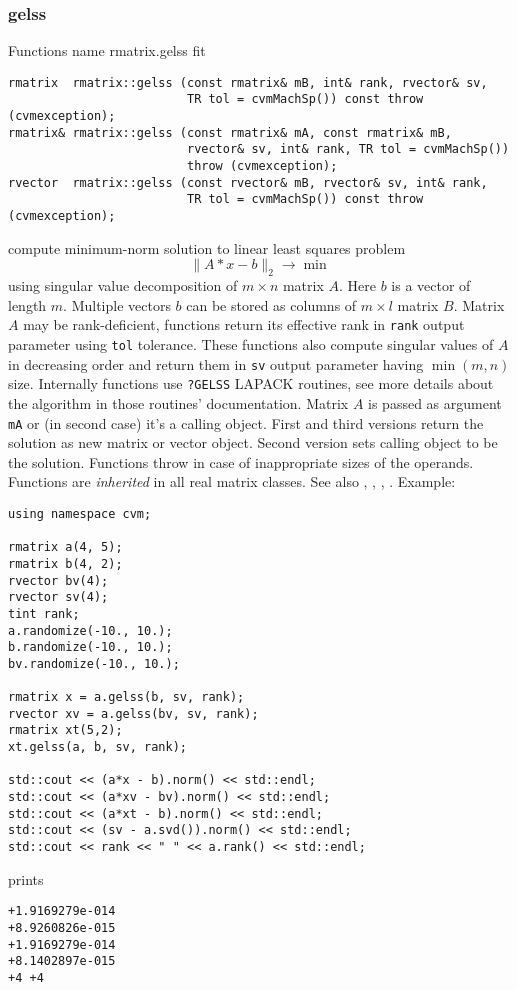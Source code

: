 \subsubsection{gelss}
Functions%
\pdfdest name {rmatrix.gelss} fit
\begin{verbatim}
rmatrix  rmatrix::gelss (const rmatrix& mB, int& rank, rvector& sv,
                         TR tol = cvmMachSp()) const throw (cvmexception);
rmatrix& rmatrix::gelss (const rmatrix& mA, const rmatrix& mB, 
                         rvector& sv, int& rank, TR tol = cvmMachSp()) 
                         throw (cvmexception);
rvector  rmatrix::gelss (const rvector& mB, rvector& sv, int& rank,
                         TR tol = cvmMachSp()) const throw (cvmexception);
\end{verbatim}
compute  minimum-norm solution to  linear
least squares problem 
\begin{equation*}
\|A*x-b\|_2\to\min
\end{equation*}
using  singular value decomposition of $m\times n$ matrix $A$.
Here $b$ is a vector of length $m$.
Multiple vectors $b$ can be stored as columns of $m\times l$ matrix $B$.
Matrix $A$ may be rank-deficient,  functions return its effective rank in \verb"rank"
output parameter using \verb"tol" tolerance. These functions also compute 
singular values of $A$ in decreasing order and return them in \verb"sv" output parameter
having $\min(m,n)$ size.
Internally  functions use \verb"?GELSS" LAPACK routines, see more details
about the algorithm in those routines' documentation.
Matrix $A$ is passed as  argument \verb"mA" or (in second case) it's a calling object.
First and third versions return the solution as  new matrix or vector object.
Second version sets calling object to be the solution.
Functions throw
in case of inappropriate sizes of the operands.
Functions are \emph{inherited} in all real matrix classes.
See also , ,
, .
Example:
\begin{Verbatim}
using namespace cvm;

rmatrix a(4, 5);
rmatrix b(4, 2);
rvector bv(4);
rvector sv(4);
tint rank;
a.randomize(-10., 10.);
b.randomize(-10., 10.);
bv.randomize(-10., 10.);

rmatrix x = a.gelss(b, sv, rank);
rvector xv = a.gelss(bv, sv, rank);
rmatrix xt(5,2);
xt.gelss(a, b, sv, rank);

std::cout << (a*x - b).norm() << std::endl;
std::cout << (a*xv - bv).norm() << std::endl;
std::cout << (a*xt - b).norm() << std::endl;
std::cout << (sv - a.svd()).norm() << std::endl;
std::cout << rank << " " << a.rank() << std::endl;
\end{Verbatim}
prints
\begin{Verbatim}
+1.9169279e-014
+8.9260826e-015
+1.9169279e-014
+8.1402897e-015
+4 +4
\end{Verbatim}
\newpage



